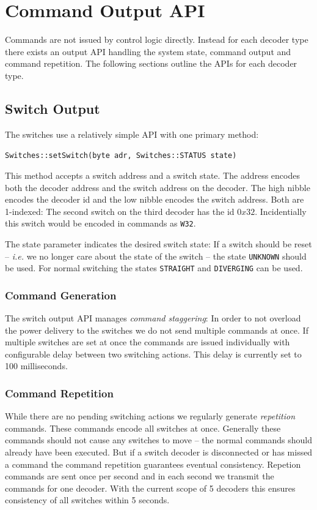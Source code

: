 \documentclass{scrreprt}
\newcommand\ie{\emph{i.e. }}
\newcommand{\code}[1]{\texttt{#1}}
\begin{document}
\section{Command Output API}
Commands are not issued by control logic directly.
Instead for each decoder type there exists an output API handling the system state, command output and command repetition.
The following sections outline the APIs for each decoder type.

\subsection{Switch Output}
The switches use a relatively simple API with one primary method:

\code{Switches::setSwitch(byte adr, Switches::STATUS state)}

This method accepts a switch address and a switch state.
The address encodes both the decoder address and the switch address on the decoder.
The high nibble encodes the decoder id and the low nibble encodes the switch address.
Both are 1-indexed:
The second switch on the third decoder has the id $0x32$.
Incidentially this switch would be encoded in commands as \code{W32}.

The state parameter indicates the desired switch state: If a switch should be reset -- \ie we no longer care about the state of the switch -- the state \code{UNKNOWN} should be used.
For normal switching the states \code{STRAIGHT} and \code{DIVERGING} can be used.

\subsubsection{Command Generation}
The switch output API manages \emph{command staggering}:
In order to not overload the power delivery to the switches we do not send multiple commands at once.
If multiple switches are set at once the commands are issued individually with configurable delay between two switching actions.
This delay is currently set to 100 milliseconds.

\subsubsection{Command Repetition}
While there are no pending switching actions we regularly generate \emph{repetition} commands.
These commands encode all switches at once.
Generally these commands should not cause any switches to move -- the normal commands should already have been executed.
But if a switch decoder is disconnected or has missed a command the command repetition guarantees eventual consistency.
Repetion commands are sent once per second and in each second we transmit the commands for one decoder.
With the current scope of 5 decoders this ensures consistency of all switches within 5 seconds.
\end{document}
